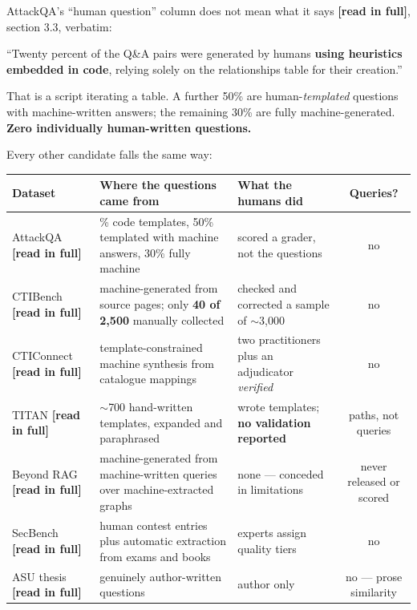 \documentclass[11pt,a4paper]{article}
\newcommand{\readtag}{\textcolor{standing}{\textbf{[read in full]}}}
\begin{document}
\begin{alertbox}{AttackQA's ``human question'' column does not mean what it says}
\readtag, section 3.3, verbatim:

\vspace{4pt}
``Twenty percent of the Q\&A pairs were generated by humans \textbf{using heuristics
embedded in code}, relying solely on the relationships table for their creation.''

\vspace{4pt}
That is a script iterating a table. A further 50\% are human-\emph{templated}
questions with machine-written answers; the remaining 30\% are fully machine-generated.
\textbf{Zero individually human-written questions.}
\end{alertbox}

Every other candidate falls the same way:

\begin{center}
\footnotesize
\begin{tabularx}{\textwidth}{@{}l>{\RaggedRight}X>{\RaggedRight}p{4.1cm}c@{}}
\toprule
\textbf{Dataset} & \textbf{Where the questions came from} & \textbf{What the humans did} & \textbf{Queries?} \\
\midrule
AttackQA \readtag & 20\% code templates, 50\% templated with machine answers, 30\% fully machine & scored a grader, not the questions & no \\
CTIBench \readtag & machine-generated from source pages; only \textbf{40 of 2{,}500} manually collected & checked and corrected a sample of $\sim$3{,}000 & no \\
CTIConnect \readtag & template-constrained machine synthesis from catalogue mappings & two practitioners plus an adjudicator \emph{verified} & no \\
TITAN \readtag & $\sim$700 hand-written templates, expanded and paraphrased & wrote templates; \textbf{no validation reported} & paths, not queries \\
Beyond RAG \readtag & machine-generated from machine-written queries over machine-extracted graphs & none --- conceded in limitations & never released or scored \\
SecBench \readtag & human contest entries plus automatic extraction from exams and books & experts assign quality tiers & no \\
ASU thesis \readtag & 30 genuinely author-written questions & author only & no --- prose similarity \\
\bottomrule
\end{tabularx}
\end{center}
\end{document}
